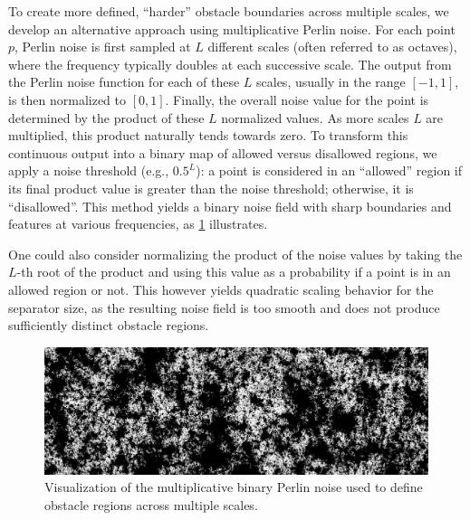 To create more defined, \enquote{harder} obstacle boundaries across multiple scales, we develop an alternative approach using multiplicative Perlin noise.
For each point \(p\), Perlin noise is first sampled at \(L\) different scales (often referred to as octaves), where the frequency typically doubles at each successive scale.
The output from the Perlin noise function for each of these \(L\) scales, usually in the range \([-1, 1]\), is then normalized to \([0, 1]\).
Finally, the overall noise value for the point is determined by the product of these \(L\) normalized values.
As more scales \(L\) are multiplied, this product naturally tends towards zero.
To transform this continuous output into a binary map of allowed versus disallowed regions, we apply a noise threshold (e.g., \(0.5^L\)): a point is considered in an \enquote{allowed} region if its final product value is greater than the noise threshold; otherwise, it is \enquote{disallowed}.
This method yields a binary noise field with sharp boundaries and features at various frequencies, as \cref{fig:multiplicative_binary_noise_viz} illustrates.

One could also consider normalizing the product of the noise values by taking the \(L\)-th root of the product and using this value as a probability if a point is in an allowed region or not.
This however yields quadratic scaling behavior for the separator size, as the resulting noise field is too smooth and does not produce sufficiently distinct obstacle regions.

\begin{figure}[tbhp]
	\centering
	\includegraphics[width=\linewidth]{graphics/noise_image.png}
	\caption{Visualization of the multiplicative binary Perlin noise used to define obstacle regions across multiple scales.}
	\label{fig:multiplicative_binary_noise_viz}
\end{figure}

